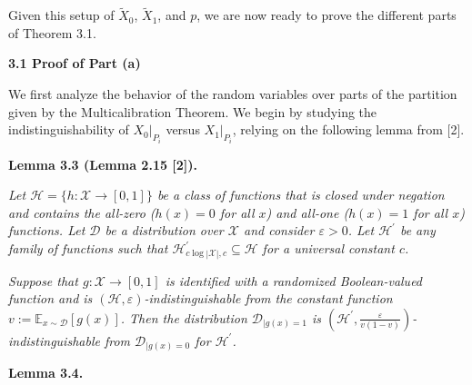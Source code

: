 


Given this setup of $\widetilde{X}_{0}$, $\widetilde{X}_{1}$, and $p$, we are now ready to prove the different parts of Theorem 3.1.\par





\par\medskip\noindent\textbf{
3.1 Proof of Part (a)}\par




We first analyze the behavior of the random variables over parts of the partition given by the Multicalibration Theorem. We begin by studying the indistinguishability of $X_{0}|_{P_{i}}$ versus $X_{1}|_{P_{i}}$, relying on the following lemma from [2].\par





\par\medskip\noindent\textbf{
\textbf{Lemma 3.3}\textbf{ }(Lemma 2.15 [2])\textbf{.}
}\par



\emph{Let $\mathcal{H}=\{h:\mathcal{X}\to[0,1]\}$ be a class of functions that is closed under negation and contains the all-zero ($h(x)=0$ for all $x$) and all-one ($h(x)=1$ for all $x$) functions. Let $\mathcal{D}$ be a distribution over $\mathcal{X}$ and consider $\varepsilon>0$. Let $\mathcal{H}^{\prime}$ be any family of functions such that $\mathcal{H}^{\prime}_{c\log|\mathcal{X}|,c}\subseteq\mathcal{H}$ for a universal constant $c$.}\par




\emph{Suppose that $g:\mathcal{X}\to[0,1]$ is identified with a randomized Boolean-valued function and is $(\mathcal{H},\varepsilon)$-indistinguishable from the constant function $v:=\mathbb{E}_{x\sim\mathcal{D}}[g(x)]$. Then the distribution $\mathcal{D}_{|g(x)=1}$ is $\left(\mathcal{H}^{\prime},\frac{\varepsilon}{v(1-v)}\right)$-indistinguishable from $\mathcal{D}_{|g(x)=0}$ for $\mathcal{H}^{\prime}$.}\par







\par\medskip\noindent\textbf{
\textbf{Lemma 3.4}\textbf{.}
}\par



